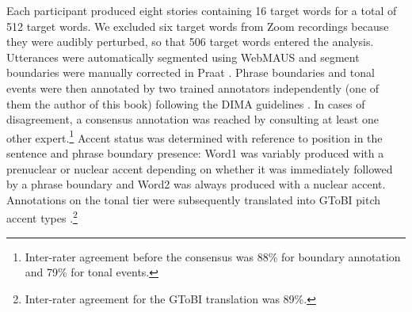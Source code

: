 Each participant produced eight stories containing 16 target words for a total of 512 target words. We excluded six target words from Zoom recordings because they were audibly perturbed, so that 506 target words entered the analysis. Utterances were automatically segmented using WebMAUS \citep{schielAutomaticPhoneticTranscription1999, kislerMultilingualProcessingSpeech2017} and segment boundaries were manually corrected in Praat \citep{boersmaPraatDoingPhonetics2023}. Phrase boundaries and tonal events were then annotated by two trained annotators independently (one of them the author of this book) following the DIMA guidelines \citep{kuglerDeutscheIntonationModellierung2022}. In cases of disagreement, a consensus annotation was reached by consulting at least one other expert.\footnote{Inter-rater agreement before the consensus was 88\% for boundary annotation and 79\% for tonal events.} Accent status was determined with reference to position in the sentence and phrase boundary presence: Word1 was variably produced with a prenuclear or nuclear accent depending on whether it was immediately followed by a phrase boundary and Word2 was always produced with a nuclear accent. Annotations on the tonal tier were subsequently translated into GToBI pitch accent types \citep{griceGermanIntonationAutosegmentalMetrical2005}.\footnote{Inter-rater agreement for the GToBI translation was 89\%.}

